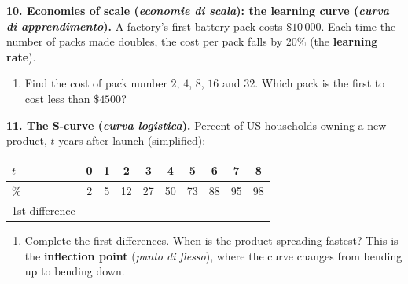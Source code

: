 \documentclass[12pt, twoside]{article}
\newcommand{\ita}[1]{(\emph{#1})}
\begin{document}
\textbf{10. Economies of scale \ita{economie di scala}: the learning curve
\ita{curva di apprendimento}.} A factory's first battery pack costs
$\$10\,000$. Each time the number of packs made doubles, the cost per
pack falls by $20\%$ (the \textbf{learning rate}).

\begin{enumerate}[label=(\alph*), itemsep=0.1cm]
  \item Find the cost of pack number $2$, $4$, $8$, $16$ and $32$. Which
  pack is the first to cost less than $\$4500$?
  \vspace{1.2cm}
\end{enumerate}

\textbf{11. The S-curve \ita{curva logistica}.} Percent of US households
owning a new product, $t$ years after launch (simplified):

\begin{center}
\renewcommand{\arraystretch}{1.3}
\begin{tabular}{|l|c|c|c|c|c|c|c|c|c|}
  \hline
  $t$ & 0 & 1 & 2 & 3 & 4 & 5 & 6 & 7 & 8 \\ \hline
  \% & 2 & 5 & 12 & 27 & 50 & 73 & 88 & 95 & 98 \\ \hline
  1st difference & \multicolumn{9}{c|}{} \\ \hline
\end{tabular}
\end{center}

\begin{enumerate}[label=(\alph*), itemsep=0.1cm]
  \item Complete the first differences. When is the product spreading
  fastest? This is the \textbf{inflection point} \ita{punto di flesso},
  where the curve changes from bending up to bending down.
  \vspace{0.6cm}
\end{enumerate}
\end{document}
